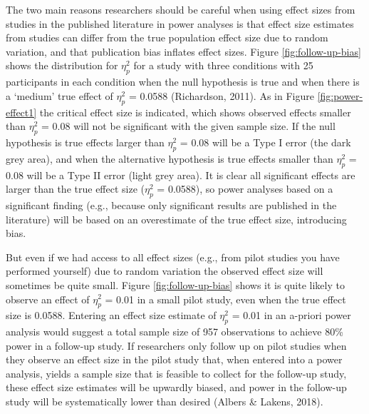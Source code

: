 \documentclass[
  english,
  ,jou,floatsintext]{apa6}
\begin{document}
The two main reasons researchers should be careful when using effect sizes from studies in the published literature in power analyses is that effect size estimates from studies can differ from the true population effect size due to random variation, and that publication bias inflates effect sizes. Figure \ref{fig:follow-up-bias} shows the distribution for \(\eta_p^2\) for a study with three conditions with 25 participants in each condition when the null hypothesis is true and when there is a `medium' true effect of \(\eta_p^2\) = 0.0588 (Richardson, 2011). As in Figure \ref{fig:power-effect1} the critical effect size is indicated, which shows observed effects smaller than \(\eta_p^2\) = 0.08 will not be significant with the given sample size. If the null hypothesis is true effects larger than \(\eta_p^2\) = 0.08 will be a Type I error (the dark grey area), and when the alternative hypothesis is true effects smaller than \(\eta_p^2\) = 0.08 will be a Type II error (light grey area). It is clear all significant effects are larger than the true effect size (\(\eta_p^2\) = 0.0588), so power analyses based on a significant finding (e.g., because only significant results are published in the literature) will be based on an overestimate of the true effect size, introducing bias.

But even if we had access to all effect sizes (e.g., from pilot studies you have performed yourself) due to random variation the observed effect size will sometimes be quite small. Figure \ref{fig:follow-up-bias} shows it is quite likely to observe an effect of \(\eta_p^2\) = 0.01 in a small pilot study, even when the true effect size is 0.0588. Entering an effect size estimate of \(\eta_p^2\) = 0.01 in an a-priori power analysis would suggest a total sample size of 957 observations to achieve 80\% power in a follow-up study. If researchers only follow up on pilot studies when they observe an effect size in the pilot study that, when entered into a power analysis, yields a sample size that is feasible to collect for the follow-up study, these effect size estimates will be upwardly biased, and power in the follow-up study will be systematically lower than desired (Albers \& Lakens, 2018).
\end{document}
